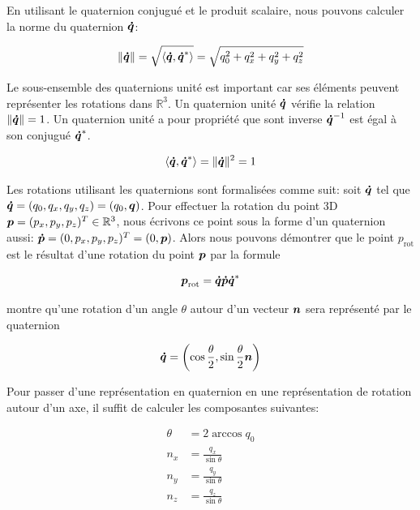 \documentclass[12pt,a4paper]{report}
\begin{document}
\begin{appendix}
		\para En utilisant le quaternion conjugué et le produit scalaire, nous pouvons calculer la norme du quaternion $\boldsymbol{\dot{q}}$:
		
		\begin{equation*}
		\|\boldsymbol{\dot{q}}\| = \sqrt{\langle \boldsymbol{\dot{q}}, \boldsymbol{\dot{q}}^{\ast} \rangle} = \sqrt{q_0^2 + q_x^2 + q_y^2 + q_z^2}
		\end{equation*} 
		
		\para Le sous-ensemble des quaternions unité est important car ses éléments peuvent représenter les rotations dans $\mathbb{R}^3$. Un quaternion unité $\boldsymbol{\dot{q}}$	vérifie la relation $\|\boldsymbol{\dot{q}}\| = 1$. Un quaternion unité a pour propriété que sont inverse $\boldsymbol{\dot{q}}^{-1}$ est égal à son conjugué $\boldsymbol{\dot{q}}^\ast$.
		
		\begin{equation*}
		\langle \boldsymbol{\dot{q}}, \boldsymbol{\dot{q}}^{\ast} \rangle = \|\boldsymbol{\dot{q}}\|^2 = 1
		\end{equation*}
		
		\para Les rotations utilisant les quaternions sont formalisées comme suit: soit $\boldsymbol{\dot{q}}$ tel que $\boldsymbol{\dot{q}} = (q_0,q_x,q_y,q_z) = (q_0,\boldsymbol{q})$. Pour effectuer la rotation du point 3D $\boldsymbol{p}=(p_x,p_y,p_z)^T \in \mathbb{R}^3$, nous écrivons ce point sous la forme d'un quaternion aussi: $\boldsymbol{\dot{p}} = (0, p_x,p_y,p_z)^T = (0,\boldsymbol{p})$. Alors nous pouvons démontrer que le point $p_{\mathrm{rot}}$ est le résultat d'une rotation du point $\boldsymbol{p}$ par la formule
		
		\begin{equation*}
		\boldsymbol{p}_{\mathrm{rot}} = \boldsymbol{\dot{q}\dot{p}\dot{q}}^{\ast}
		\end{equation*}
		
		\para \cite{nuchter_3d_2009} montre qu'une rotation d'un angle $\theta$ autour d'un vecteur $\boldsymbol{n}$ sera représenté par le quaternion 
		
		\begin{equation*}
			\boldsymbol{\dot{q}} = \left( \cos{\frac{\theta}{2}}, \sin{\frac{\theta}{2}}\boldsymbol{n} \right)
		\end{equation*}
		
		\para Pour passer d'une représentation en quaternion en une représentation de rotation autour d'un axe, il suffit de calculer les composantes suivantes:
		
		\begin{equation*}
		\begin{aligned}
			\theta 	&= 2 \arccos{q_0} \\
			n_x 	&= \frac{q_x}{\sin{\theta}} \\
			n_y		&= \frac{q_y}{\sin{\theta}} \\
			n_z		&= \frac{q_z}{\sin{\theta}} 
		\end{aligned}
		\end{equation*}

\end{appendix}

\nocite{*}


\end{document}
